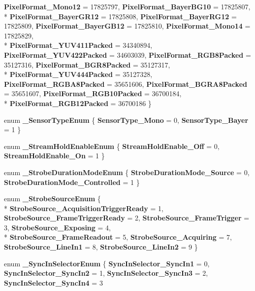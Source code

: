 \begin{DoxyCompactItemize}
{\bfseries Pixel\-Format\-\_\-\-Mono12} = 17825797, 
{\bfseries Pixel\-Format\-\_\-\-Bayer\-B\-G10} = 17825807, 
\\*
{\bfseries Pixel\-Format\-\_\-\-Bayer\-G\-R12} = 17825808, 
{\bfseries Pixel\-Format\-\_\-\-Bayer\-R\-G12} = 17825809, 
{\bfseries Pixel\-Format\-\_\-\-Bayer\-G\-B12} = 17825810, 
{\bfseries Pixel\-Format\-\_\-\-Mono14} = 17825829, 
\\*
{\bfseries Pixel\-Format\-\_\-\-Y\-U\-V411\-Packed} = 34340894, 
{\bfseries Pixel\-Format\-\_\-\-Y\-U\-V422\-Packed} = 34603039, 
{\bfseries Pixel\-Format\-\_\-\-R\-G\-B8\-Packed} = 35127316, 
{\bfseries Pixel\-Format\-\_\-\-B\-G\-R8\-Packed} = 35127317, 
\\*
{\bfseries Pixel\-Format\-\_\-\-Y\-U\-V444\-Packed} = 35127328, 
{\bfseries Pixel\-Format\-\_\-\-R\-G\-B\-A8\-Packed} = 35651606, 
{\bfseries Pixel\-Format\-\_\-\-B\-G\-R\-A8\-Packed} = 35651607, 
{\bfseries Pixel\-Format\-\_\-\-R\-G\-B10\-Packed} = 36700184, 
\\*
{\bfseries Pixel\-Format\-\_\-\-R\-G\-B12\-Packed} = 36700186
 \}
\item 
enum {\bfseries \-\_\-\-Sensor\-Type\-Enum} \{ {\bfseries Sensor\-Type\-\_\-\-Mono} = 0, 
{\bfseries Sensor\-Type\-\_\-\-Bayer} = 1
 \}
\item 
enum {\bfseries \-\_\-\-Stream\-Hold\-Enable\-Enum} \{ {\bfseries Stream\-Hold\-Enable\-\_\-\-Off} = 0, 
{\bfseries Stream\-Hold\-Enable\-\_\-\-On} = 1
 \}
\item 
enum {\bfseries \-\_\-\-Strobe\-Duration\-Mode\-Enum} \{ {\bfseries Strobe\-Duration\-Mode\-\_\-\-Source} = 0, 
{\bfseries Strobe\-Duration\-Mode\-\_\-\-Controlled} = 1
 \}
\item 
enum {\bfseries \-\_\-\-Strobe\-Source\-Enum} \{ \\*
{\bfseries Strobe\-Source\-\_\-\-Acquisition\-Trigger\-Ready} = 1, 
{\bfseries Strobe\-Source\-\_\-\-Frame\-Trigger\-Ready} = 2, 
{\bfseries Strobe\-Source\-\_\-\-Frame\-Trigger} = 3, 
{\bfseries Strobe\-Source\-\_\-\-Exposing} = 4, 
\\*
{\bfseries Strobe\-Source\-\_\-\-Frame\-Readout} = 5, 
{\bfseries Strobe\-Source\-\_\-\-Acquiring} = 7, 
{\bfseries Strobe\-Source\-\_\-\-Line\-In1} = 8, 
{\bfseries Strobe\-Source\-\_\-\-Line\-In2} = 9
 \}
\item 
enum {\bfseries \-\_\-\-Sync\-In\-Selector\-Enum} \{ {\bfseries Sync\-In\-Selector\-\_\-\-Sync\-In1} = 0, 
{\bfseries Sync\-In\-Selector\-\_\-\-Sync\-In2} = 1, 
{\bfseries Sync\-In\-Selector\-\_\-\-Sync\-In3} = 2, 
{\bfseries Sync\-In\-Selector\-\_\-\-Sync\-In4} = 3

\end{DoxyCompactItemize}
